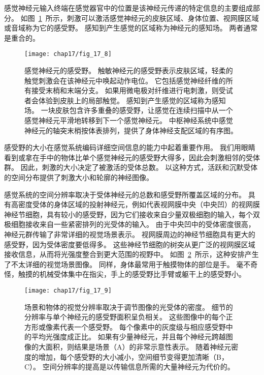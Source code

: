 感觉神经元输入终端在感觉器官中的位置是该神经元传递的特定信息的主要组成部分。 
如图~\ref{fig:17_8}~所示，刺激可以激活感觉神经元的皮肤区域、身体位置、视网膜区域或音域称为它的感受野。
感知到产生感觉的区域称为神经元的感知场。
两者通常是重合的。


\begin{figure}[htbp]
	\centering
	\texttt{[image: chap17/fig\_17\_8]}
	\caption{感觉神经元的感受野。
		触敏神经元的感受野表示皮肤区域，轻柔的触觉刺激会在该神经元中唤起动作电位。
		它包括感觉神经纤维的所有接受末梢和末端分支。
		如果用微电极对纤维进行电刺激，则受试者会体验到皮肤上的局部触觉。
		感知到产生感觉的区域称为感知场。
		一块皮肤包含许多重叠的感受野，让感觉在连续扫描中从一个感觉神经元平滑地转移到下一个感觉神经元。
		中枢神经系统中感觉神经元的轴突末梢按体表排列，提供了身体神经支配区域的有序图。}
	\label{fig:17_8}
\end{figure}

感受野的大小在感觉系统编码详细空间信息的能力中起着重要作用。 
我们用眼睛看到或拿在手中的物体比单个感觉神经元的感受野大得多，因此会刺激相邻的受体群。 
因此，刺激的大小决定了被激活的受体总数。 
以这种方式，活跃和沉默受体的空间分布提供了刺激大小和轮廓的神经图像。


感觉系统的空间分辨率取决于受体神经元的总数和感受野所覆盖区域的分布。
具有高密度受体的身体区域的投射神经元，例如代表视网膜中央（中央凹）的视网膜神经节细胞，具有较小的感受野，因为它们接收来自少量双极细胞的输入，每个双极细胞接收来自一些紧密排列的光受体的输入。
由于中央凹中的受体密度很高，神经元群传输了非常详细的视觉场景表示。
视网膜周边的神经节细胞具有更大的感受野，因为受体密度要低得多。
这些神经节细胞的树突从更广泛的视网膜区域接收信息，从而将光强度整合到更大范围的视野中。
如图~\ref{fig:17_9}~所示，这种安排产生了不太详细的视觉场景图像。
同样，身体最常用于触摸物体的部位是手。
毫不奇怪，触摸的机械受体集中在指尖，手上的感受野比手臂或躯干上的感受野小。


\begin{figure}[htbp]
	\centering
	\texttt{[image: chap17/fig\_17\_9]}
	\caption{场景和物体的视觉分辨率取决于调节图像的光受体的密度。
		细节的分辨率与单个神经元的感受野面积呈负相关。
		这些图像中的每个正方形或像素代表一个感受野。
		每个像素中的灰度级与相应感受野中的平均光强度成正比。
		如果有少量神经元，并且每个神经元跨越图像的大面积，则结果是场景（A）的非常示意性表示。 
		随着神经元密度的增加，每个感受野的大小减小，空间细节变得更加清晰（B，C）。
		空间分辨率的提高是以传输信息所需的大量神经元为代价的。}
	\label{fig:17_9}
\end{figure}



